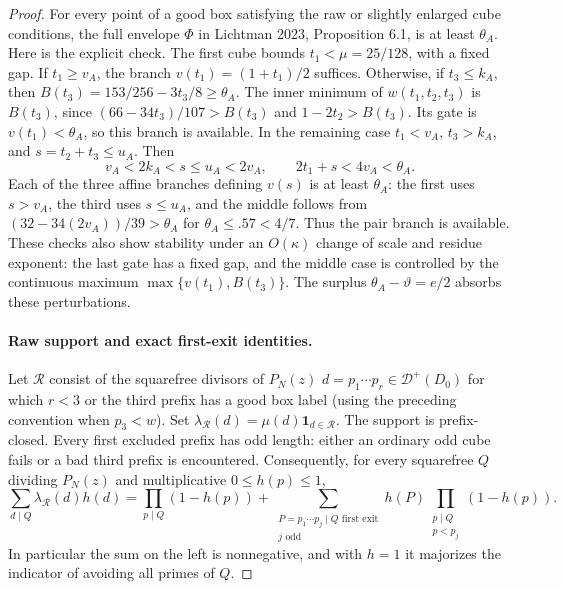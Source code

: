\documentclass[11pt]{article}
\begin{document}
\begin{proof}
For every point of a good box satisfying the raw or slightly enlarged
cube conditions, the full envelope $\Phi$ in Lichtman 2023,
Proposition 6.1, is at least $\theta_A$. Here is the explicit check.
The first cube bounds $t_1<\mu=25/128$, with a fixed gap.
If $t_1\ge v_A$, the branch $v(t_1)=(1+t_1)/2$ suffices.
Otherwise, if $t_3\le k_A$, then $B(t_3)=153/256-3t_3/8\ge\theta_A$.
The inner minimum of $w(t_1,t_2,t_3)$ is $B(t_3)$, since
$(66-34t_3)/107>B(t_3)$ and $1-2t_2>B(t_3)$.
Its gate is $v(t_1)<\theta_A$, so this branch is available.
In the remaining case $t_1<v_A$, $t_3>k_A$, and
$s=t_2+t_3\le u_A$. Then
\[
 v_A<2k_A<s\le u_A<2v_A,
 \qquad 2t_1+s<4v_A<\theta_A.
\]
Each of the three affine branches defining $v(s)$ is at least
$\theta_A$: the first uses $s>v_A$, the third uses $s\le u_A$,
and the middle follows from
$(32-34(2v_A))/39>\theta_A$ for $\theta_A\le.57<4/7$.
Thus the pair branch is available. These checks also show stability
under an $O(\kappa)$ change of scale and residue exponent:
the last gate has a fixed gap, and the middle case is controlled by
the continuous maximum $\max\{v(t_1),B(t_3)\}$.
The surplus $\theta_A-\vartheta=e/2$ absorbs these perturbations.

\paragraph{Raw support and exact first-exit identities.}
Let $\mathcal R$ consist of the squarefree divisors of $P_N(z)$
$d=p_1\cdots p_r\in\mathcal D^+(D_0)$ for which $r<3$ or the
third prefix has a good box label (using the preceding convention
when $p_3<w$). Set $\lambda_{\mathcal R}(d)=\mu(d)\mathbf1_{d\in\mathcal R}$.
The support is prefix-closed. Every first excluded prefix has odd
length: either an ordinary odd cube fails or a bad third prefix is
encountered. Consequently, for every squarefree $Q$ dividing $P_N(z)$
and multiplicative $0\le h(p)\le1$,
\begin{equation}\label{eq:odd-first-exit-identity}
 \sum_{d\mid Q}\lambda_{\mathcal R}(d)h(d)
 =\prod_{p\mid Q}(1-h(p))+
 \sum_{\substack{P=p_1\cdots p_j\mid Q\text{ first exit}\\j\text{ odd}}}
 h(P)\prod_{\substack{p\mid Q\\p<p_j}}(1-h(p)).
\end{equation}
In particular the sum on the left is nonnegative, and with $h=1$
it majorizes the indicator of avoiding all primes of $Q$.


\end{proof}
\end{document}
